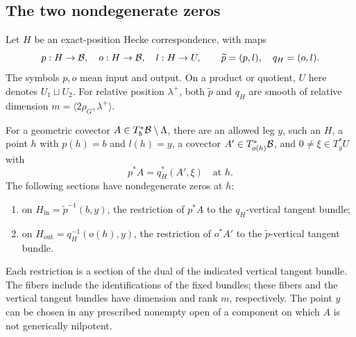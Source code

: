 \subsection{The two nondegenerate zeros}

Let $H$ be an exact-position Hecke correspondence, with maps
\[
 p:H\to\mathcal B,\quad o:H\to\mathcal B,\quad l:H\to U,
 \qquad \widetilde p=(p,l),\quad q_H=(o,l).
\]
The symbols $p,o$ mean input and output.  On a product or quotient,
$U$ here denotes $U_1\sqcup U_2$.  For relative position $\lambda^+$,
both $\widetilde p$ and $q_H$ are smooth of relative dimension
$m=\langle2\rho_G,\lambda^+\rangle$.

\begin{proposition}\label{geom:transverse}
For a geometric covector $A\in T_b^*\mathcal B\setminus\Lambda$, there are
an allowed leg $y$, such an $H$, a point $h$ with $p(h)=b$ and $l(h)=y$,
a covector $A'\in T^*_{o(h)}\mathcal B$, and $0\ne\xi\in T_y^*U$ with
\begin{equation}\label{geom:identity}
                         p^*A=q_H^*(A',\xi)\quad\text{at }h.
\end{equation}
The following sections have nondegenerate zeros at $h$:
\begin{enumerate}
\item on $H_{\mathrm{in}}=\widetilde p^{-1}(b,y)$, the restriction
of $p^*A$ to the $q_H$-vertical tangent bundle;
\item on $H_{\mathrm{out}}=q_H^{-1}(o(h),y)$, the restriction
of $o^*A'$ to the $\widetilde p$-vertical tangent bundle.
\end{enumerate}
Each restriction is a section of the dual of the indicated vertical
tangent bundle.  The fibers include the identifications of the fixed
bundles; these fibers and the vertical tangent bundles have dimension
and rank $m$, respectively.  The point $y$
can be chosen in any prescribed nonempty open of a component on which
$A$ is not generically nilpotent.
\end{proposition}

